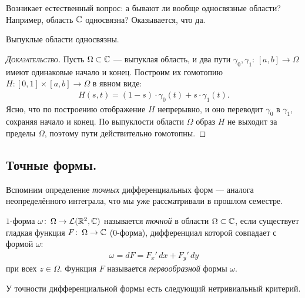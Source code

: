 \documentclass[../complex-analysis.tex]{subfiles}
\begin{document}
Возникает естественный вопрос: а бывают ли вообще односвязные области? Например, область $ \mathbb{C} $ односвязна? Оказывается, что да.

\begin{prop}
 Выпуклые области односвязны.
\end{prop}
\begin{proof}[\normalfont\textsc{Доказательство}]
 Пусть $ \Omega \subset \mathbb{C} $ --- выпуклая область, и два пути $ \gamma_0,\gamma_1\colon\,[a,b] \to \Omega $ имеют одинаковые начало и конец. Построим их гомотопию $ H \colon[0,1] \times [a,b]\to\Omega $ в явном виде:
 \begin{align*}
  H(s,t) = (1 - s) \cdot \gamma_0(t) + s \cdot \gamma_1(t).
 \end{align*} Ясно, что по построению отображение $ H $ непрерывно, и оно переводит $ \gamma_0 $ в $ \gamma_1 $, сохраняя начало и конец. По выпуклости области $ \Omega $ образ $ H $ не выходит за пределы $ \Omega $, поэтому пути действительно гомотопны.
\end{proof}

\subsection{Точные формы.}

Вспомним определение \textit{точных} дифференциальных форм --- аналога неопределённого интеграла, что мы уже рассматривали в прошлом семестре.

\begin{df}
 $1$-форма $\omega \colon\, \Omega \to \mathcal{L}(\mathbb{R}^2, \mathbb{C})$ называется \textit{точной} в области $\Omega \subset \mathbb{C}$, если существует гладкая функция $F \colon\, \Omega \to \mathbb{C}$ ($0$-форма), дифференциал которой совпадает с формой $ \omega $:
 \begin{align*}
  \omega = dF = F_x'\,dx + F_y'\,dy
 \end{align*} при всех $ z \in \Omega $. Функция $ F $ называется \textit{первообразной} формы $ \omega $.
\end{df}

У точности дифференциальной формы есть следующий нетривиальный критерий.
\end{document}
